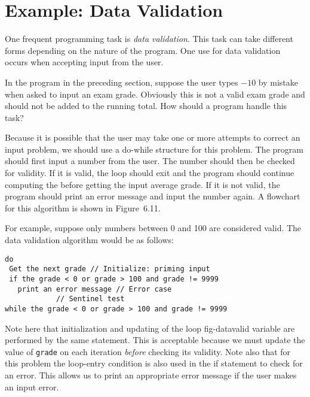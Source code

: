 \section{Example: Data Validation}
\label{example-data-validation}
\noindent One frequent programming task is {\it data validation}. This
task can take different forms depending on the nature of the
program. One use for data validation occurs when accepting input from
the user.

In the program in the preceding section, suppose the user types $-10$
by mistake when asked to input an exam grade. Obviously this is not a
valid exam grade and should not be added to the running total. How
should a program handle this task?

Because it is possible that the user may take one or more attempts
to correct an input problem, we should use a do-while structure for
this problem.  The program should first input a number from the
user. The number should then be checked for validity. If it is valid,
the loop should exit and the program should continue computing the
before getting the input average grade. If it is not valid, the
program should print an error message and input the number again. A
flowchart for this algorithm is shown in Figure~6.11.

For example, suppose only numbers between 0 and 100 are considered
valid. The data validation algorithm would be as follows:

\begin{jjjlisting}
\begin{lstlisting}
do
 Get the next grade // Initialize: priming input
 if the grade < 0 or grade > 100 and grade != 9999
   print an error message // Error case
            // Sentinel test
while the grade < 0 or grade > 100 and grade != 9999 
\end{lstlisting}
\end{jjjlisting}

\noindent Note here that initialization and updating of the loop
{fig-datavalid}
variable are performed by the same statement. This is acceptable
because we must update the value of {\tt grade} on each iteration {\it
before} checking its validity. Note also that for this problem the
loop-entry condition is also used in the if statement to check for an
error.  This allows us to print an appropriate error message if the
user makes an input error.

